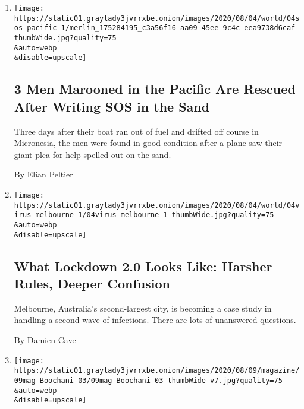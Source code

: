 \begin{enumerate}
\def\labelenumi{\arabic{enumi}.}
\item
  \href{/2020/08/04/world/australia/sos-pacific-island.html}{}

  \texttt{[image: https://static01.graylady3jvrrxbe.onion/images/2020/08/04/world/04sos-pacific-1/merlin\_175284195\_c3a56f16-aa09-45ee-9c4c-eea9738d6caf-thumbWide.jpg?quality=75\\\&auto=webp\\\&disable=upscale]}

  \hypertarget{3-men-marooned-in-the-pacific-are-rescued-after-writing-sos-in-the-sand}{%
  \subsection{3 Men Marooned in the Pacific Are Rescued After Writing
  SOS in the
  Sand}\label{3-men-marooned-in-the-pacific-are-rescued-after-writing-sos-in-the-sand}}

  Three days after their boat ran out of fuel and drifted off course in
  Micronesia, the men were found in good condition after a plane saw
  their giant plea for help spelled out on the sand.

  By Elian Peltier
\item
  \href{/2020/08/04/world/australia/coronavirus-melbourne-lockdown.html}{}

  \texttt{[image: https://static01.graylady3jvrrxbe.onion/images/2020/08/04/world/04virus-melbourne-1/04virus-melbourne-1-thumbWide.jpg?quality=75\\\&auto=webp\\\&disable=upscale]}

  \hypertarget{what-lockdown-20-looks-like-harsher-rules-deeper-confusion}{%
  \subsection{What Lockdown 2.0 Looks Like: Harsher Rules, Deeper
  Confusion}\label{what-lockdown-20-looks-like-harsher-rules-deeper-confusion}}

  Melbourne, Australia's second-largest city, is becoming a case study
  in handling a second wave of infections. There are lots of unanswered
  questions.

  By Damien Cave
\item
  \href{/2020/08/04/magazine/behrouz-boochani-australia.html}{}

  \texttt{[image: https://static01.graylady3jvrrxbe.onion/images/2020/08/09/magazine/09mag-Boochani-03/09mag-Boochani-03-thumbWide-v7.jpg?quality=75\\\&auto=webp\\\&disable=upscale]}

  \hypertarget{feature}{%
}
\end{enumerate}
